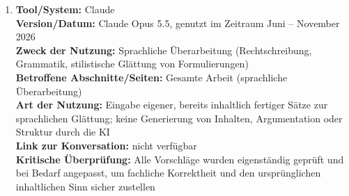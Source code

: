 \documentclass[
thesis=master,
%
language=german,
%
faculty=cb,	
%
%
%
%
%
%
%
%
graduatedtoc,
%
fancy,
%
glossaryfront,
%
%
%
%
%
%
%
%
%
%
%
%
%
%
%
%
%
]{hsmw-vorlage-rw}
\begin{document}
\begin{enumerate}
	\item \textbf{Tool/System:} Claude \\
		\textbf{Version/Datum:} Claude Opus 5.5, genutzt im Zeitraum Juni – November 2026 \\
		\textbf{Zweck der Nutzung:} Sprachliche Überarbeitung (Rechtschreibung, Grammatik, stilistische Glättung von Formulierungen) \\
		\textbf{Betroffene Abschnitte/Seiten:} Gesamte Arbeit (sprachliche Überarbeitung) \\
		\textbf{Art der Nutzung:} Eingabe eigener, bereits inhaltlich fertiger Sätze zur sprachlichen Glättung; keine Generierung von Inhalten, Argumentation oder Struktur durch die KI \\
		\textbf{Link zur Konversation:} nicht verfügbar \\
 		\textbf{Kritische Überprüfung:} Alle Vorschläge wurden eigenständig geprüft und bei Bedarf angepasst, um fachliche Korrektheit und den ursprünglichen inhaltlichen Sinn sicher zustellen \\
\end{enumerate}
 
\end{document}
